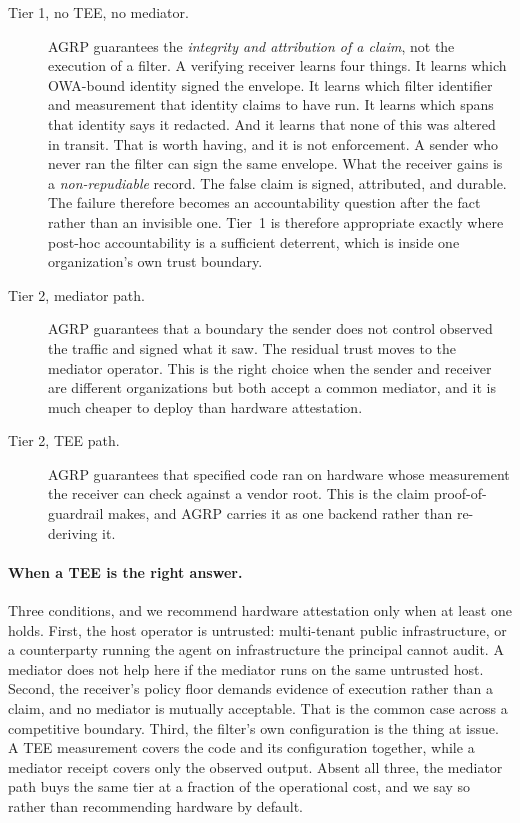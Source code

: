 \begin{description}
  \item[Tier 1, no TEE, no mediator.] AGRP guarantees the
    \emph{integrity and attribution of a claim}, not the
    execution of a filter. A verifying receiver learns four
    things. It learns which OWA-bound identity signed the
    envelope. It learns which filter identifier and
    measurement that identity claims to have run. It learns
    which spans that identity says it redacted. And it learns
    that none of this was altered in transit.
    That is worth having, and it is not enforcement. A
    sender who never ran the filter can sign the same
    envelope. What the receiver gains is a
    \emph{non-repudiable} record. The false claim is signed,
    attributed, and durable. The failure therefore becomes an
    accountability question after the fact rather than an
    invisible one. Tier~1 is therefore appropriate exactly
    where post-hoc accountability is a sufficient deterrent,
    which is inside one organization's own trust boundary.
  \item[Tier 2, mediator path.] AGRP guarantees that a
    boundary the sender does not control observed the
    traffic and signed what it saw. The residual trust moves
    to the mediator operator. This is the right choice when
    the sender and receiver are different organizations but
    both accept a common mediator, and it is much cheaper to
    deploy than hardware attestation.
  \item[Tier 2, TEE path.] AGRP guarantees that specified
    code ran on hardware whose measurement the receiver can
    check against a vendor root. This is the claim
    proof-of-guardrail makes, and AGRP carries it as one
    backend rather than re-deriving it.
\end{description}

\paragraph{When a TEE is the right answer.}
Three conditions, and we recommend hardware attestation only
when at least one holds. First, the host operator is
untrusted: multi-tenant public infrastructure, or a
counterparty running the agent on infrastructure the
principal cannot audit. A mediator does not help here if the
mediator runs on the same untrusted host. Second, the
receiver's policy floor demands evidence of execution rather
than a claim, and no mediator is mutually acceptable. That
is the common case across a competitive boundary. Third, the
filter's own configuration is the thing at issue. A TEE
measurement covers the code and its configuration together,
while a mediator receipt covers only the observed
output. Absent all three, the mediator path buys the same
tier at a fraction of the operational cost, and we say so
rather than recommending hardware by default.

